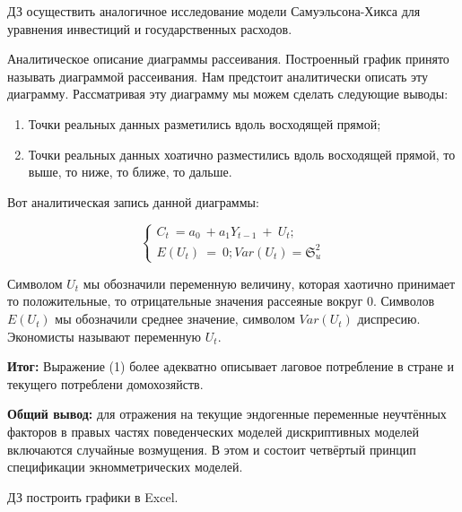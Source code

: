 \documentclass[12pt,a4paper]{article}
\begin{document}
	$\displaystyle \boxed{\text{ДЗ}}$ осуществить аналогичное исследование модели Самуэльсона-Хикса для уравнения инвестиций и государственных расходов. 

	Аналитическое описание диаграммы рассеивания. Построенный график принято называть диаграммой рассеивания. Нам предстоит аналитически описать эту диаграмму. Рассматривая эту диаграмму мы можем сделать следующие выводы:
\begin{enumerate}
\item Точки реальных данных разметились вдоль восходящей прямой;
\item Точки реальных данных хоатично разместились вдоль восходящей прямой, то выше, то ниже, то ближе, то дальше.
\end{enumerate}

	Вот аналитическая запись данной диаграммы:
	
\begin{equation*}
\begin{cases}
C_{t} \ =a_{0} \ +a_{1} Y_{t-1} \ +\ U_{t} ;\\
E( U_{t}) \ =\ 0;Var( U_{t}) =\mathfrak{S}^{2}_{u}
\end{cases}
\end{equation*}

	Символом $\displaystyle U_{t}$ мы обозначили переменную величину, которая хаотично принимает то положительные, то отрицательные значения рассеяные вокруг 0. Символов $\displaystyle E( U_{t})$ мы обозначили среднее значение, символом $\displaystyle Var( U_{t})$ диспресию. Экономисты называют переменную $\displaystyle U_{t}$.

\textbf{Итог: }Выражение (1) более адекватно описывает лаговое потребление в стране и текущего потреблени домохозяйств.

	\textbf{Общий вывод:} для отражения на текущие эндогенные переменные неучтённых факторов в правых частях поведенческих моделей дискриптивных моделей включаются случайные возмущения. В этом и состоит четвёртый принцип спецификации экномметрических моделей.

	$\displaystyle \boxed{\text{ДЗ}}$ построить графики в Excel.
\end{document}
